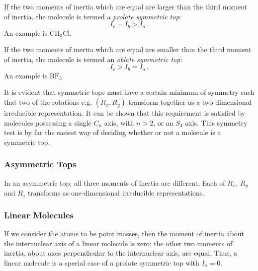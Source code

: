 \documentclass{article}
\theoremstyle{plain}\theoremheaderfont{\normalfont\itshape}\theorembodyfont{\rmfamily}\theoremseparator{.}\newtheorem*{rem}{Remark}\newtheorem*{ex}{Example}\newtheorem*{proof}{Proof}\newtheorem*{altp}{Alternative proof}
\theoremstyle{plain}\theoremheaderfont{\normalfont\bfseries}\theorembodyfont{\rmfamily}\theoremseparator{.}\newtheorem{thm}{Theorem}[section]\newtheorem{lem}[thm]{Lemma}\newtheorem{prop}[thm]{Proposition}\newtheorem*{cor}{Corollary}\newtheorem{defn}[thm]{Definition}\newtheorem{clm}[thm]{Claim}\newtheorem{clminproof}{Claim}\newtheorem{pos}{Postulate}[section]
\theoremstyle{break}\theoremheaderfont{\normalfont\itshape}\theorembodyfont{\rmfamily}\theoremseparator{.\medskip}\newtheorem*{proofskip}{Proof}\newtheorem*{exs}{Examples}\newtheorem*{rems}{Remarks}
\theoremstyle{break}\theoremheaderfont{\normalfont\bfseries}\theorembodyfont{\rmfamily}\theoremseparator{.\medskip}\newtheorem{lemskip}[thm]{Lemma}\newtheorem{defnskip}[thm]{Definition}\newtheorem{propskip}[thm]{Proposition}\newtheorem{thmskip}[thm]{Theorem}
\numberwithin{equation}{section}
\begin{document}
    If the two moments of inertia which are equal are larger than the third moment of inertia, the molecule is termed a \textit{prolate symmetric top}:
    \begin{equation}
        I_c=I_b>I_a\,.
    \end{equation}
    An example is \(\mathrm{CH_3Cl}\).

    If the two moments of inertia which are equal are smaller than the third moment of inertia, the molecule is termed an \textit{oblate symmetric top}:
    \begin{equation}
        I_c>I_b=I_a\,.
    \end{equation}
    An example is \(\mathrm{BF_3}\).

    It is evident that symmetric tops must have a certain minimum of symmetry such that two of the rotations e.g. \((R_x,R_y)\) transform together as a two-dimensional irreducible representation. It can be shown that this requirement is satisfied by molecules possessing a single \(C_n\) axis, with \(n>2\), or an \(S_4\) axis. This symmetry test is by far the easiest way of deciding whether or not a molecule is a symmetric top.
    \subsubsection{Asymmetric Tops}
    In an asymmetric top, all three moments of inertia are different. Each of \(R_x\), \(R_y\) and \(R_z\) transforms as one-dimensional irreducible representations.

    \subsubsection{Linear Molecules}
    \begin{figure}[ht!]
        \centering
    \end{figure}
    If we consider the atoms to be point masses, then the moment of inertia about the internuclear axis of a linear molecule is zero; the other two moments of inertia, about axes perpendicular to the internuclear axis, are equal. Thus, a linear molecule is a special case of a prolate symmetric top with \(I_a=0\).
\end{document}
